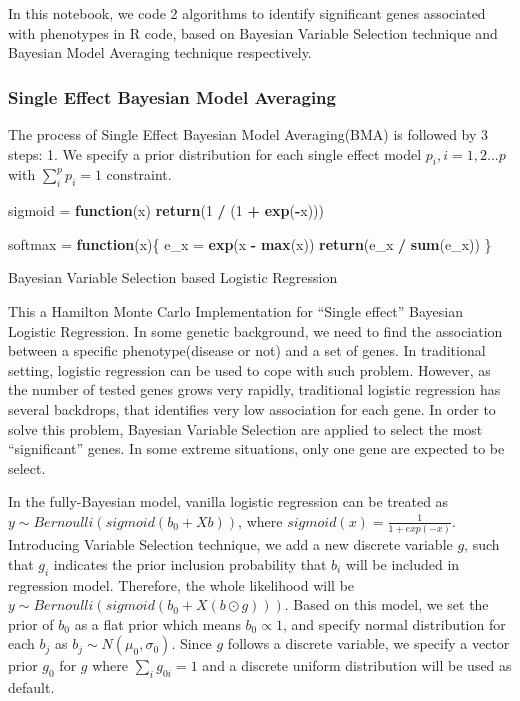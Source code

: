 \documentclass[
]{article}
\newenvironment{Shaded}{\begin{snugshade}}{\end{snugshade}}
\newcommand{\ControlFlowTok}[1]{\textcolor[rgb]{0.13,0.29,0.53}{\textbf{#1}}}
\newcommand{\DecValTok}[1]{\textcolor[rgb]{0.00,0.00,0.81}{#1}}
\newcommand{\KeywordTok}[1]{\textcolor[rgb]{0.13,0.29,0.53}{\textbf{#1}}}
\newcommand{\NormalTok}[1]{#1}
\newcommand{\OperatorTok}[1]{\textcolor[rgb]{0.81,0.36,0.00}{\textbf{#1}}}
\newcommand{\StringTok}[1]{\textcolor[rgb]{0.31,0.60,0.02}{#1}}
\begin{document}
In this notebook, we code 2 algorithms to identify significant genes
associated with phenotypes in R code, based on Bayesian Variable
Selection technique and Bayesian Model Averaging technique respectively.

\hypertarget{single-effect-bayesian-model-averaging}{%
\subsubsection{Single Effect Bayesian Model
Averaging}\label{single-effect-bayesian-model-averaging}}

The process of Single Effect Bayesian Model Averaging(BMA) is followed
by 3 steps: 1. We specify a prior distribution for each single effect
model \(p_i,i=1,2...p\) with \(\sum_i^pp_i = 1\) constraint.

\begin{Shaded}
\begin{Highlighting}[]
\NormalTok{sigmoid =}\StringTok{ }\ControlFlowTok{function}\NormalTok{(x) }\KeywordTok{return}\NormalTok{(}\DecValTok{1} \OperatorTok{/}\StringTok{ }\NormalTok{(}\DecValTok{1} \OperatorTok{+}\StringTok{ }\KeywordTok{exp}\NormalTok{(}\OperatorTok{-}\NormalTok{x)))}

\NormalTok{softmax =}\StringTok{ }\ControlFlowTok{function}\NormalTok{(x)\{}
\NormalTok{  e_x =}\StringTok{ }\KeywordTok{exp}\NormalTok{(x }\OperatorTok{-}\StringTok{ }\KeywordTok{max}\NormalTok{(x))}
  \KeywordTok{return}\NormalTok{(e_x }\OperatorTok{/}\StringTok{ }\KeywordTok{sum}\NormalTok{(e_x))}
\NormalTok{\}}
\end{Highlighting}
\end{Shaded}

Bayesian Variable Selection based Logistic Regression

This a Hamilton Monte Carlo Implementation for ``Single effect''
Bayesian Logistic Regression. In some genetic background, we need to
find the association between a specific phenotype(disease or not) and a
set of genes. In traditional setting, logistic regression can be used to
cope with such problem. However, as the number of tested genes grows
very rapidly, traditional logistic regression has several backdrops,
that identifies very low association for each gene. In order to solve
this problem, Bayesian Variable Selection are applied to select the most
``significant'' genes. In some extreme situations, only one gene are
expected to be select.

In the fully-Bayesian model, vanilla logistic regression can be treated
as \(y \sim Bernoulli(sigmoid(b_0 + Xb))\), where
\(sigmoid(x) = \frac{1}{1 + exp(-x)}\). Introducing Variable Selection
technique, we add a new discrete variable \(g\), such that \(g_i\)
indicates the prior inclusion probability that \(b_i\) will be included
in regression model. Therefore, the whole likelihood will be
\(y \sim Bernoulli(sigmoid(b_0 + X(b \odot g)))\). Based on this model,
we set the prior of \(b_0\) as a flat prior which means
\(b_0 \varpropto 1\), and specify normal distribution for each \(b_j\)
as \(b_j \sim N(\mu_0, \sigma_0)\). Since \(g\) follows a discrete
variable, we specify a vector prior \(g_0\) for \(g\) where
\(\sum_ig_{0i} = 1\) and a discrete uniform distribution will be used as
default.
\end{document}
